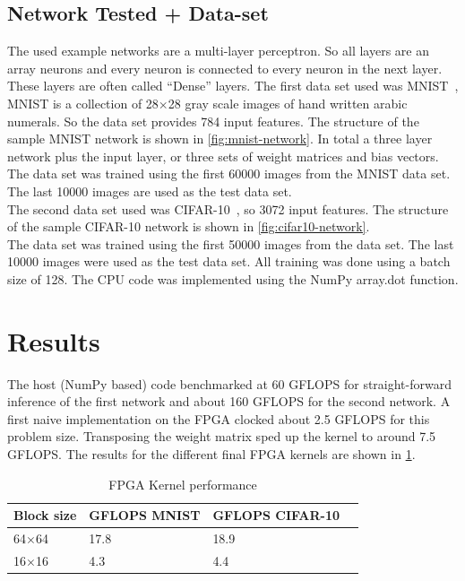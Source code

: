 \documentclass[techrep,english]{ipsj} %
\begin{document}
\subsection{Network Tested + Data-set}
The used example networks are a multi-layer perceptron.
So all layers are an array neurons and every neuron is connected to every neuron in the next layer.
These layers are often called ``Dense'' layers.
The first data set used was MNIST~\cite{lecun2010mnist}, MNIST is a collection of 28\(\times\)28 gray scale images of hand written arabic numerals.
So the data set provides \num{784} input features.
The structure of the sample MNIST network is shown in \cref{fig:mnist-network}.
In total a three layer network plus the input layer, or three sets of weight matrices and bias vectors.
The data set was trained using the first \num{60000} images from the MNIST data set.
The last \num{10000} images are used as the test data set.\\
The second data set used was CIFAR-10~\cite{krizhevsky2014cifar}, so \num{3072} input features.
The structure of the sample CIFAR-10 network is shown in \cref{fig:cifar10-network}.\\
The data set was trained using the first \num{50000} images from the data set.
The last \num{10000} images were used as the test data set.
All training was done using a batch size of \num{128}.
The CPU code was implemented using the NumPy array.dot function.

\section{Results}\label{sec:result}
The host (NumPy based) code benchmarked at \num{60} GFLOPS for straight-forward inference of the first network and about \num{160} GFLOPS for the second network.
A first naive implementation on the FPGA clocked about \num{2.5} GFLOPS for this problem size.
Transposing the weight matrix sped up the kernel to around \num{7.5} GFLOPS.\@
The results for the different final FPGA kernels are shown in \cref{tab:kernel-performance}.

\begin{table}[h]
  \centering
  \caption{FPGA Kernel performance}\label{tab:kernel-performance}
  \begin{tabular}{llll}
    \toprule
    \textbf{Block size} & \textbf{GFLOPS MNIST}  & \textbf{GFLOPS CIFAR-10}  \\
    \midrule
    64$\times$64 & \num{17.8} & \num{18.9}  \\ %
    16$\times$16 & \num{4.3} & \num{4.4} \\ %
    \bottomrule
  \end{tabular}
\end{table}
\end{document}
